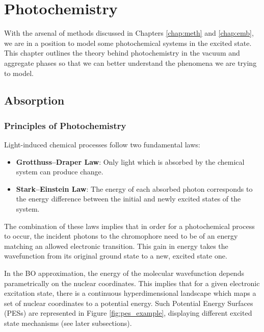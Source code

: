 \chapter{Photochemistry}
With the arsenal of methods discussed in Chapters \ref{chap:meth} and \ref{chap:emb}, we are in a position to model some photochemical systems in the excited state. This chapter outlines the theory behind photochemistry in the vacuum and aggregate phases so that we can better understand the phenomena we are trying to model.

\section{Absorption}
\subsection{Principles of Photochemistry}
Light-induced chemical processes follow two fundamental laws:\cite{Persico2018}
\begin{itemize}
    \item \textbf{Grotthuss–Draper Law}: Only light which is absorbed by the chemical system can produce change.
    \item \textbf{Stark–Einstein Law}: The energy of each absorbed photon corresponds to the energy difference between the initial and newly excited states of the system.
\end{itemize}
The combination of these laws implies that in order for a photochemical process to occur, the incident photons to the chromophore need to be of an energy matching an allowed electronic transition. This gain in energy takes the wavefunction from its original ground state to a new, excited state one.

In the BO approximation, the energy of the molecular wavefunction depends parametrically on the nuclear coordinates. This implies that for a given electronic excitation state, there is a continuous hyperdimensional landscape which maps a set of nuclear coordinates to a potential energy. Such Potential Energy Surfaces (PESs) are represented in Figure \ref{fig:pes_example}, displaying different excited state mechanisms (see later subsections).

